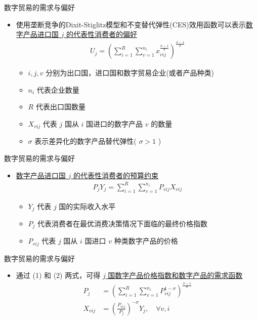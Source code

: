 \documentclass{beamer}
\begin{document}
\begin{frame}{数字贸易的需求与偏好}
    \begin{itemize}
        \item 使用垄断竞争的Dixit-Stiglitz模型和不变替代弹性(CES)效用函数可以表示\underline{数字产品进口国 $j$ 的代表性消费者的偏好}%
        \begin{gather*}
            U_j = (\sum_{i=1}^{R} \sum_{v=1}^{n_i} x_{vij}^{\frac{\sigma - 1} {\sigma}})^{\frac{\sigma -1}{\sigma}} \tag{1}
        \end{gather*}
        \begin{itemize}
            \item $i, j, v$ 分别为出口国，进口国和数字贸易企业(或者产品种类)
            \item $n_i$ 代表企业数量
            \item $R$ 代表出口国数量
            \item $X_{vij}$ 代表 $j$ 国从 $i$ 国进口的数字产品 $v$ 的数量
            \item $\sigma$ 表示差异化的数字产品替代弹性( $\sigma > 1$ )
        \end{itemize}
    \end{itemize}
\end{frame}

\begin{frame}{数字贸易的需求与偏好}
    \begin{itemize}
        \item \underline{数字产品进口国 $j$ 的代表性消费者的预算约束}%
        \begin{gather*}
            P_jY_j = \sum_{i=1}^{R} \sum_{v=1}^{n_i} P_{vij}X_{vij} \tag{2}
        \end{gather*}
        \begin{itemize}
            \item $Y_j$ 代表 $j$ 国的实际收入水平
            \item $P_j$ 代表消费者在最优消费决策情况下面临的最终价格指数
            \item $P_{vij}$ 代表 $j$ 国从 $i$ 国进口 $v$ 种类数字产品的价格
        \end{itemize}
    \end{itemize}
\end{frame}

\begin{frame}{数字贸易的需求与偏好}
    \begin{itemize}
        \item 通过 (1) 和 (2) 两式，可得 \underline{$j$ 国数字产品价格指数和数字产品的需求函数}%
        \begin{align*}
            P_j &= (\sum_{i=1}^{R} \sum_{v=1}^{n_i} P_{vij}^{1 - \sigma})^{\frac{\sigma - 1}{\sigma}} \tag{3} \\
            X_{vij} &= (\frac{P_{vij}}{P_j})^{-\sigma}Y_j,\quad \forall v, i \tag{4}
        \end{align*}
    \end{itemize}
\end{frame}
\end{document}
